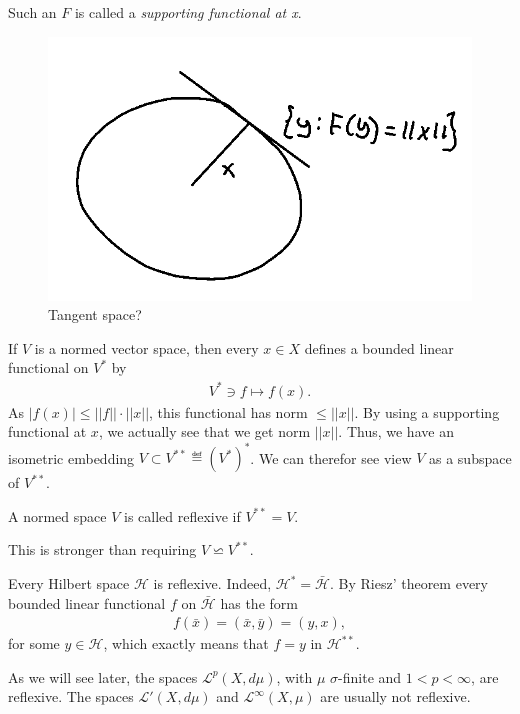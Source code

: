Such an \(F\) is called a \emph{supporting functional at x}.
\begin{figure}[H]
    \centering
    \includegraphics[scale=0.4]{../Figs/hanah_banach1.png}
    \caption{Tangent space?}
\end{figure}
If \(V\) is a normed vector space, then every \(x\in X\) defines a bounded linear functional on \(V^*\) by 
\begin{align*}
    V^*\ni f\mapsto f(x).
\end{align*}
As \(|f(x)|\leq ||f||\cdot ||x||\), this functional has norm \(\leq ||x||\). By using a supporting functional at \(x\), we actually see that
we get norm \(||x||\). Thus, we have an isometric embedding \(V\subset V^{**}\eqdef (V^*)^*\). We can therefor see view \(V\) as a subspace
of \(V^{**}\).
\begin{definition}
    A normed space \(V\) is called reflexive if \(V^{**}=V\).
\end{definition}
\begin{remark}
    This is stronger than requiring \(V\backsimeq V^{**}\).
\end{remark}
\begin{remark}
    Every Hilbert space \(\mathcal{H}\) is reflexive. Indeed, \(\mathcal{H}^*=\bar{\mathcal{H}}\). By Riesz' theorem every bounded linear 
    functional \(f\) on \(\bar{\mathcal{H}}\) has the form
    \begin{align*}
        f(\bar{x}) = (\bar{x}, \bar{y}) = (y,x),
    \end{align*}
    for some \(y\in\mathcal{H}\), which exactly means that \(f=y\) in \(\mathcal{H}^{**}\).

    As we will see later, the spaces \(\mathcal{L}^{p}(X,d\mu)\), with \(\mu\) \(\sigma\)-finite and \(1<p<\infty\), are reflexive. The spaces
    \(\mathcal{L}'(X, d\mu)\) and \(\mathcal{L}^{\infty}(X,\mu)\) are usually not reflexive.
\end{remark}